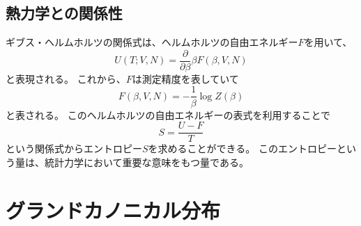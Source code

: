 \documentclass[a4paper]{jsreport}
\begin{document}
        \section{熱力学との関係性}
            ギブス・ヘルムホルツの関係式は、ヘルムホルツの自由エネルギー$F$を用いて、
            \begin{equation}
                U(T; V, N) = \frac{\partial}{\partial\beta}{\beta F(\beta, V, N)}
            \end{equation}
            と表現される。
            これから、$F$は測定精度を表していて
            \begin{equation} \label{eq:4a}
                F(\beta, V, N) = - \frac{1}{\beta} \log{Z(\beta)}
            \end{equation}
            と表される。
            このヘルムホルツの自由エネルギーの表式を利用することで
            \begin{equation}
                S = \frac{U - F}{T}
            \end{equation}
            という関係式からエントロピー$S$を求めることができる。
            このエントロピーという量は、統計力学において重要な意味をもつ量である。





    \chapter{グランドカノニカル分布}
\end{document}
